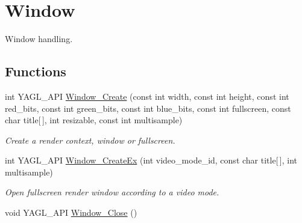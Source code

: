 \hypertarget{group____window}{\section{Window}
\label{group____window}
}


Window handling.  


\subsection*{Functions}
\begin{DoxyCompactItemize}
\item 
int Y\-A\-G\-L\-\_\-\-A\-P\-I \hyperlink{group____window_gad5b57e088274077555b963af04f18c01}{Window\-\_\-\-Create} (const int width, const int height, const int red\-\_\-bits, const int green\-\_\-bits, const int blue\-\_\-bits, const int fullscreen, const char title\mbox{[}$\,$\mbox{]}, int resizable, const int multisample)
\begin{DoxyCompactList}\small\item\em Create a render context, window or fullscreen. \end{DoxyCompactList}\item 
int Y\-A\-G\-L\-\_\-\-A\-P\-I \hyperlink{group____window_ga8872ae4b9805c707852bd98537eb45fd}{Window\-\_\-\-Create\-Ex} (int video\-\_\-mode\-\_\-id, const char title\mbox{[}$\,$\mbox{]}, int multisample)
\begin{DoxyCompactList}\small\item\em Open fullscreen render window according to a video mode. \end{DoxyCompactList}\item 
\hypertarget{group____window_ga2c855f7d4da7e2050efd59247b0194ab}{void Y\-A\-G\-L\-\_\-\-A\-P\-I \hyperlink{group____window_ga2c855f7d4da7e2050efd59247b0194ab}{Window\-\_\-\-Close} ()}\label{group____window_ga2c855f7d4da7e2050efd59247b0194ab}


\end{DoxyCompactItemize}

